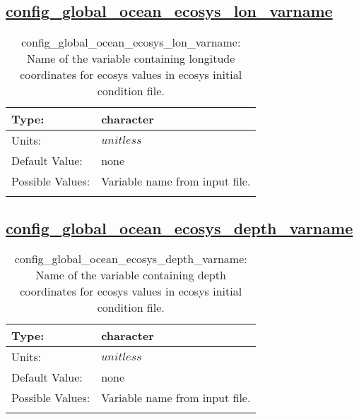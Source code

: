\subsection[config\_global\_ocean\_ecosys\_lon\_varname]{\hyperref[sec:nm_tab_global_ocean]{config\_global\_ocean\_ecosys\_lon\_varname}}
\label{subsec:nm_sec_config_global_ocean_ecosys_lon_varname}
\begin{center}
\begin{longtable}{| p{2.0in} || p{4.0in} |}
    \hline
    Type: & character \\
    \hline
    Units: & $unitless$ \\
    \hline
    Default Value: & none \\
    \hline
    Possible Values: & Variable name from input file. \\
    \hline
    \caption{config\_global\_ocean\_ecosys\_lon\_varname: Name of the variable containing longitude coordinates for ecosys values in ecosys initial condition file.}
\end{longtable}
\end{center}
\subsection[config\_global\_ocean\_ecosys\_depth\_varname]{\hyperref[sec:nm_tab_global_ocean]{config\_global\_ocean\_ecosys\_depth\_varname}}
\label{subsec:nm_sec_config_global_ocean_ecosys_depth_varname}
\begin{center}
\begin{longtable}{| p{2.0in} || p{4.0in} |}
    \hline
    Type: & character \\
    \hline
    Units: & $unitless$ \\
    \hline
    Default Value: & none \\
    \hline
    Possible Values: & Variable name from input file. \\
    \hline
    \caption{config\_global\_ocean\_ecosys\_depth\_varname: Name of the variable containing depth coordinates for ecosys values in ecosys initial condition file.}
\end{longtable}
\end{center}
